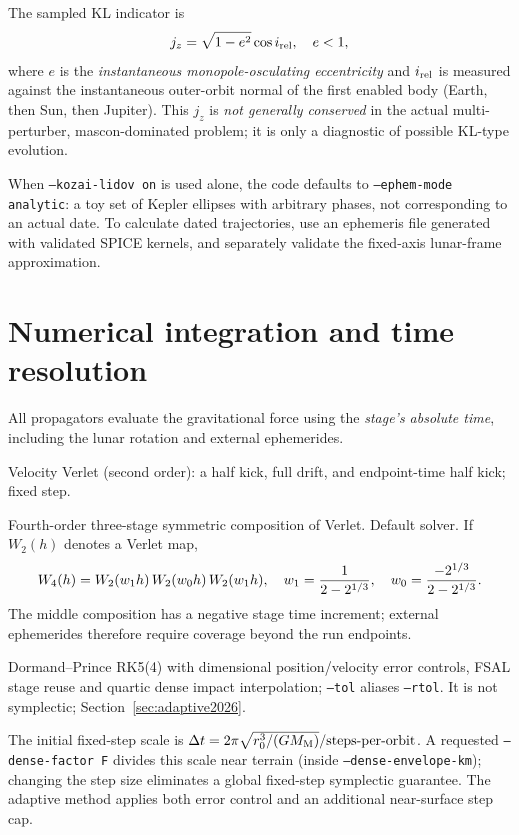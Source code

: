 \documentclass[11pt,a4paper]{article}
\newcommand{\opt}[1]{\texttt{#1}}
\begin{document}
The sampled KL indicator is
\begin{equation}
\label{eq:jz} j_z=\sqrt{1-e^2}\cos i_{\rm rel},\quad e<1,
\end{equation}
where \(e\) is the \emph{instantaneous monopole-osculating eccentricity} and \(i_{\rm rel}\) is measured against the instantaneous outer-orbit normal of the first enabled body (Earth, then Sun, then Jupiter). This \(j_z\) is \emph{not generally conserved} in the actual multi-perturber, mascon-dominated problem; it is only a diagnostic of possible KL-type evolution.

\begin{note}[title={Ephemeris modes are not equivalent}]
When \opt{--kozai-lidov on} is used alone, the code defaults to \opt{--ephem-mode analytic}: a toy set of Kepler ellipses with arbitrary phases, not corresponding to an actual date. To calculate dated trajectories, use an ephemeris file generated with validated SPICE kernels, and separately validate the fixed-axis lunar-frame approximation.
\end{note}

\section{Numerical integration and time resolution}
All propagators evaluate the gravitational force using the \emph{stage's absolute time}, including the lunar rotation and external ephemerides.
\begin{description}[leftmargin=3cm,labelwidth=2.6cm]
\item[\opt{verlet}] Velocity Verlet (second order): a half kick, full drift, and endpoint-time half kick; fixed step.
\item[\opt{yoshida4}] Fourth-order three-stage symmetric composition of Verlet. Default solver. If \(W_2(h)\) denotes a Verlet map,
\[W_4(h)=W_2(w_1h)\,W_2(w_0h)\,W_2(w_1h),\quad
w_1={1\over2-2^{1/3}},\quad w_0={-2^{1/3}\over2-2^{1/3}}.\]
The middle composition has a negative stage time increment; external ephemerides therefore require coverage beyond the run endpoints.
\item[\opt{adaptive}] Dormand--Prince RK5(4) with dimensional position/velocity error controls, FSAL stage reuse and quartic dense impact interpolation; \opt{--tol} aliases \opt{--rtol}. It is not symplectic; Section~\ref{sec:adaptive2026}.
\end{description}
The initial fixed-step scale is \(\Delta t=2\pi\sqrt{r_0^3/(GM_{\rm M})}/\text{steps-per-orbit}\). A requested \opt{--dense-factor F} divides this scale near terrain (inside \opt{--dense-envelope-km}); changing the step size eliminates a global fixed-step symplectic guarantee. The adaptive method applies both error control and an additional near-surface step cap.
\end{document}
